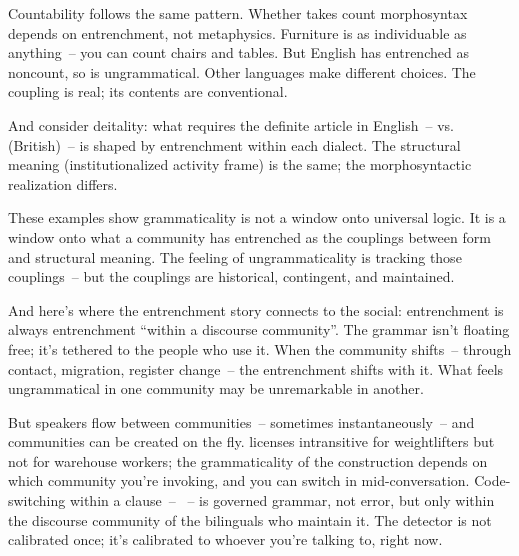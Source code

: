 Countability follows the same pattern. Whether  takes count morphosyntax depends on entrenchment, not metaphysics. Furniture is as individuable as anything~-- you can count chairs and tables. But English has entrenched  as noncount, so \ungram{} is ungrammatical. Other languages make different choices. The coupling is real; its contents are conventional.

And consider deitality: what requires the definite article in English~--  vs.~ (British)~-- is shaped by entrenchment within each dialect. The structural meaning (institutionalized activity frame) is the same; the morphosyntactic realization differs.

These examples show grammaticality is not a window onto universal logic. It is a window onto what a community has entrenched as the couplings between form and structural meaning. The feeling of ungrammaticality is tracking those couplings~-- but the couplings are historical, contingent, and maintained.

And here's where the entrenchment story connects to the social: entrenchment is always entrenchment \enquote{within a discourse community}. The grammar isn't floating free; it's tethered to the people who use it. When the community shifts~-- through contact, migration, register change~-- the entrenchment shifts with it. What feels ungrammatical in one community may be unremarkable in another.

But speakers flow between communities~-- sometimes instantaneously~-- and communities can be created on the fly.  licenses intransitive  for weightlifters but not for warehouse workers; the grammaticality of the construction depends on which community you're invoking, and you can switch in mid-conversation. Code-switching within a clause~-- ~-- is governed grammar, not error, but only within the discourse community of the bilinguals who maintain it. The detector is not calibrated once; it's calibrated to whoever you're talking to, right now.

